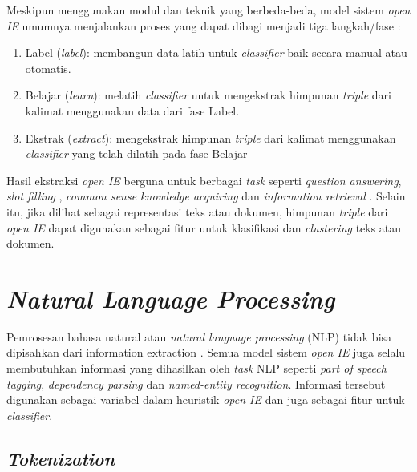 Meskipun menggunakan modul dan teknik yang berbeda-beda, model sistem \textit{open IE} umumnya menjalankan proses yang dapat dibagi menjadi tiga langkah/fase \citep{etzioni2011open}:

\begin{enumerate}
	\item Label (\textit{label}): membangun data latih untuk \textit{classifier} baik secara manual atau otomatis.
	\item Belajar (\textit{learn}): melatih \textit{classifier} untuk mengekstrak himpunan \textit{triple} dari kalimat menggunakan data dari fase Label.
	\item Ekstrak (\textit{extract}): mengekstrak himpunan \textit{triple} dari kalimat menggunakan \textit{classifier} yang telah dilatih pada fase Belajar
\end{enumerate}

Hasil ekstraksi \textit{open IE} berguna untuk berbagai \textit{task} seperti \textit{question answering}, \textit{slot filling} \citep{etzioni2011open}, \textit{common sense knowledge acquiring} \citep{singh2002open} dan \textit{information retrieval} \citep{etzioni2011search}. Selain itu, jika dilihat sebagai representasi teks atau dokumen, himpunan \textit{triple} dari \textit{open IE} dapat digunakan sebagai fitur untuk klasifikasi dan \textit{clustering} teks atau dokumen.

\section{\textit{Natural Language Processing}}

Pemrosesan bahasa natural atau \textit{natural language processing} (NLP) tidak bisa dipisahkan dari information extraction \citep{banko2007open,fader2011identifying,etzioni2011open,angeli2015leveraging}. Semua model sistem \textit{open IE} juga selalu membutuhkan informasi yang dihasilkan oleh \textit{task} NLP seperti \textit{part of speech tagging}, \textit{dependency parsing} dan \textit{named-entity recognition}. Informasi tersebut digunakan sebagai variabel dalam heuristik \textit{open IE} dan juga sebagai fitur untuk \textit{classifier}.

\subsection{\textit{Tokenization}}

